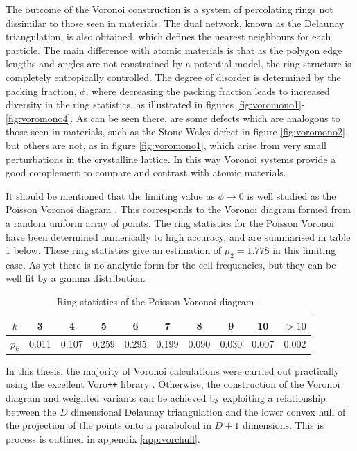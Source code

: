 The outcome of the Voronoi construction is a system of percolating rings not dissimilar to those seen in materials.
The dual network, known as the Delaunay triangulation, is also obtained, which defines the nearest neighbours for each particle.
The main difference with atomic materials is that as the polygon edge lengths and angles are not constrained by a potential model, the ring structure is  completely entropically controlled.
The degree of disorder is determined by the packing fraction, $\phi$, where decreasing the packing fraction leads to increased diversity in the ring statistics, as illustrated in figures \ref{fig:voromono1}\--\ref{fig:voromono4}.
As can be seen there, are some defects which are analogous to those seen in materials, such as the Stone\--Wales defect in figure \ref{fig:voromono2}, but others are not, as in figure \ref{fig:voromono1}, which arise from very small perturbations in the crystalline lattice.
In this way Voronoi systems provide a good complement to compare and contrast with atomic materials.

It should be mentioned that the limiting value as $\phi\rightarrow 0$ is well studied as the Poisson Voronoi diagram \cite{Boots1983,Tanemura2003}.
This corresponds to the Voronoi diagram formed from a random uniform array of points.
The ring statistics for the Poisson Voronoi have been determined numerically to high accuracy, and are summarised in table \ref{tab:pvpk} below.
These ring statistics give an estimation of $\mu_2=1.778$ in this limiting case. 
As yet there is no analytic form for the cell frequencies, but they can be well fit by a gamma distribution.

\begin{table}[h]
\centering
\caption{Ring statistics of the Poisson Voronoi diagram \cite{Tanemura2003}.}
\label{tab:pvpk}
\begin{tabular}{cccccccccc}
\toprule
$k$ & 3 & 4 & 5 & 6 & 7 & 8 & 9 & 10 & $>10$ \\
\midrule
$p_k$ & 0.011 & 0.107 & 0.259 & 0.295 & 0.199 & 0.090 & 0.030 & 0.007 & 0.002 \\
\bottomrule
\end{tabular}
\end{table}

In this thesis, the majority of Voronoi calculations were carried out practically using the excellent Voro\texttt{++} library \cite{Rycroft2009}.
Otherwise, the construction of the Voronoi diagram and weighted variants can be achieved by exploiting a relationship between the $D$ dimensional Delaunay triangulation and the lower convex hull of the projection of the points onto a paraboloid in $D+1$ dimensions.
This is process is outlined in appendix \ref{app:vorchull}.

